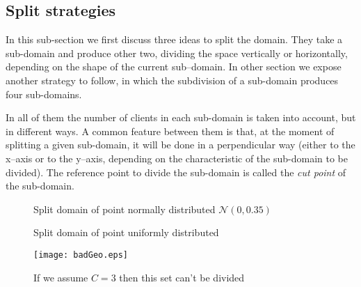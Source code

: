
\subsection{Split strategies}

In this sub-section we first discuss three ideas to split the domain. They take a sub-domain and produce other two, dividing the space vertically or horizontally, depending on the shape of the current sub--domain. In other section we expose another strategy to follow, in which the subdivision of a sub-domain produces four sub-domains.

In all of them the number of clients in each sub-domain is taken into account, but in different ways. A common feature between them is that, at the moment of splitting a given sub-domain, it will be done in a perpendicular way (either to the x--axis or to the y--axis, depending on the characteristic of the sub-domain to be divided). The reference point to divide the sub-domain is called the {\it cut point} of the sub-domain.

\begin{figure}
	\centering
	\hspace{3pt}%
	\hspace{3pt}%
	\caption[]{Split domain of point normally distributed $\mathcal{N}\left(0,0.35\right)$}%
	\label{split:norm}
\end{figure}

\begin{figure}
	\centering
	\hspace{3pt}%
	\hspace{3pt}%
	\caption[]{Split domain of point uniformly distributed}%
	\label{split:unif}
\end{figure}

\begin{figure}
	\centering
	\texttt{[image: badGeo.eps]}
	\caption[]{If we assume $C = 3$ then this set can't be divided}%
	\label{fig:badGeom}
\end{figure}

